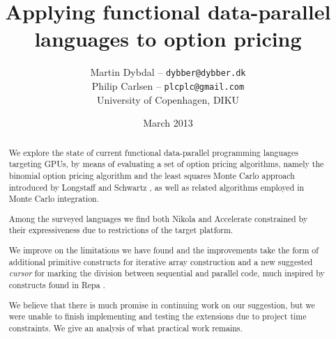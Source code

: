 \documentclass[10pt,a4paper,final,openright,twoside]{memoir}
\title{Applying functional data-parallel languages to option pricing}
\author{
  Martin Dybdal -- \texttt{dybber@dybber.dk} \\
  Philip Carlsen -- \texttt{plcplc@gmail.com}
\\
University of Copenhagen, DIKU}
\date{March 2013}
\begin{document}
\frontmatter






 \clearpage
~
\vspace{3cm}
  \begin{abstract}
    We explore the state of current functional data-parallel
    programming languages targeting GPUs, by means of evaluating a set
    of option pricing algorithms, namely the binomial option pricing
    algorithm \cite{cox1979option} and the least squares Monte Carlo
    approach introduced by Longstaff and Schwartz
    \cite{longstaff2001valuing}, as well as related algorithms
    employed in Monte Carlo integration.

    Among the surveyed languages we find both Nikola
    \cite{mainland2010nikola} and Accelerate
    \cite{chakravarty2011accelerating} constrained by their
    expressiveness due to restrictions of the target platform. 

    We improve on the limitations we have found and the improvements
    take the form of additional primitive constructs for iterative
    array construction and a new suggested \emph{cursor} for marking
    the division between sequential and parallel code, much inspired
    by constructs found in Repa \cite{keller2010regular}. 

    We believe that there is much promise in continuing work on our
    suggestion, but we were unable to finish implementing and testing
    the extensions due to project time constraints. We give an
    analysis of what practical work remains.
  \end{abstract}
\end{document}
